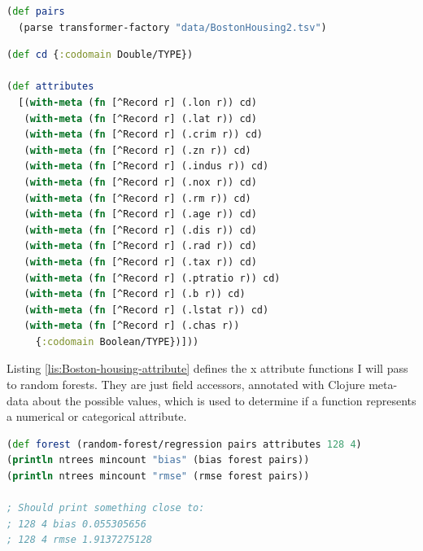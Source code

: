 \documentclass[11pt,openany,american,usenames,dvipsnames,svgnames,x11names,table,isodate]{article}
\numberwithin{equation}{section}
\numberwithin{figure}{section}
\begin{document}
\begin{minipage}[t]{1\columnwidth}%
\begin{lstlisting}[caption={Reading the Boston housing data},label={lis:Reading-the-Boston-1},language=clojure,tabsize=2]
(def pairs 
  (parse transformer-factory "data/BostonHousing2.tsv")
\end{lstlisting}
%
\end{minipage}

\begin{minipage}[t]{1\columnwidth}%
\begin{lstlisting}[caption={Boston housing attribute functions},label={lis:Boston-housing-attribute},language=clojure,tabsize=2]
(def cd {:codomain Double/TYPE})

(def attributes
  [(with-meta (fn [^Record r] (.lon r)) cd)
   (with-meta (fn [^Record r] (.lat r)) cd)
   (with-meta (fn [^Record r] (.crim r)) cd)
   (with-meta (fn [^Record r] (.zn r)) cd)
   (with-meta (fn [^Record r] (.indus r)) cd)
   (with-meta (fn [^Record r] (.nox r)) cd)
   (with-meta (fn [^Record r] (.rm r)) cd)
   (with-meta (fn [^Record r] (.age r)) cd)
   (with-meta (fn [^Record r] (.dis r)) cd)
   (with-meta (fn [^Record r] (.rad r)) cd)
   (with-meta (fn [^Record r] (.tax r)) cd)
   (with-meta (fn [^Record r] (.ptratio r)) cd)
   (with-meta (fn [^Record r] (.b r)) cd)
   (with-meta (fn [^Record r] (.lstat r)) cd)
   (with-meta (fn [^Record r] (.chas r)) 
     {:codomain Boolean/TYPE})])) 

\end{lstlisting}
%
\end{minipage}

Listing \ref{lis:Boston-housing-attribute} defines the x attribute
functions I will pass to random forests. They are just field accessors,
annotated with Clojure meta-data about the possible values, which
is used to determine if a function represents a numerical or categorical
attribute. 

\begin{minipage}[t]{1\columnwidth}%
\begin{lstlisting}[caption={Boston housing forest on training data},label={lis:Boston-housing-forest},language=clojure,tabsize=2]
(def forest (random-forest/regression pairs attributes 128 4)
(println ntrees mincount "bias" (bias forest pairs))        
(println ntrees mincount "rmse" (rmse forest pairs))

; Should print something close to:
; 128 4 bias 0.055305656 
; 128 4 rmse 1.9137275128 

\end{lstlisting}
%
\end{minipage}
\end{document}
